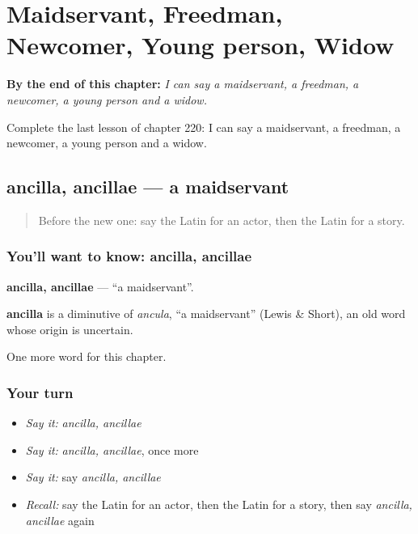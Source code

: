 
\chapter{Maidservant, Freedman, Newcomer, Young person, Widow}
\label{ch:la-maidservant-freedman-newcomer-young-person-widow}

\begin{chapteropening}
\textbf{By the end of this chapter:} \emph{I can say a maidservant, a freedman, a newcomer, a young person and a widow.}

Complete the last lesson of chapter 220: I can say a maidservant, a freedman, a newcomer, a young person and a widow.
\end{chapteropening}

\section[ancilla, ancillae]{ancilla, ancillae — a maidservant}

\label{lesson:LA-C220-ancilla}



\begin{quote}
Before the new one: say the Latin for an actor, then the Latin for a story.
\end{quote}

\subsection*{You'll want to know: ancilla, ancillae}
\textbf{ancilla, ancillae} — \textquotedblleft{}a maidservant\textquotedblright{}.

\begin{cousinweb}
\textbf{ancilla} is a diminutive of \emph{ancula}, \textquotedblleft{}a maidservant\textquotedblright{} (Lewis \& Short), an old word whose origin is uncertain.
\end{cousinweb}

\begin{grammarlens}[title={What you've built}]
One more word for this chapter.
\end{grammarlens}

\subsection*{Your turn}
\begin{itemize}
\raggedright
  \item \emph{Say it:} \emph{ancilla, ancillae}
  \item \emph{Say it:} \emph{ancilla, ancillae}, once more
  \item \emph{Say it:} say \emph{ancilla, ancillae}
  \item \emph{Recall:} say the Latin for an actor, then the Latin for a story, then say \emph{ancilla, ancillae} again
\end{itemize}

